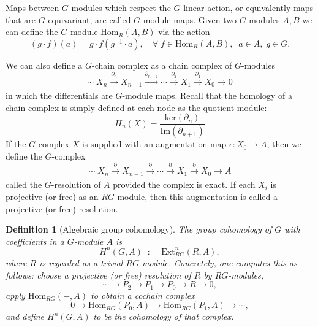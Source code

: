 \documentclass[aps,prx,reprint,superscriptaddress,twocolumn,amsmath,amssymb,amsfonts, nofootinbib]{revtex4-2}
\theoremstyle{apsstyle}
\newtheorem{definition}[theorem]{Definition}
\begin{document}
\bigskip 

Maps between $G$-modules which respect the $G$-linear action, or equivalently maps that are $G$-equivariant, are called $G$-module maps. Given two $G$-modules $A,B$ we can define the $G$-module $\mathrm{Hom}_{R}(A,B)$ via the action
\begin{equation*}
    (g\cdot f)(a) = g\cdot f(g^{-1}\cdot a),\quad \forall \; f\in \mathrm{Hom}_{R}(A,B),\;\; a\in A, \;g\in G.
\end{equation*}

\noindent We can also define a $G$-chain complex as a chain complex of $G$-modules
\begin{equation*}
    \cdots \;X_{n} \xrightarrow[]{\partial_{n}} X_{n-1} \xrightarrow[]{\partial_{n-1}} \cdots \xrightarrow[]{\partial_{2}} X_{1} \xrightarrow[]{\partial_{1}} X_{0} \to 0
\end{equation*}
in which the differentials are $G$-module maps. Recall that the homology of a chain complex is simply defined at each node as the quotient module:
\begin{equation}
    H_{n}(X) = \dfrac{\mathrm{ker}(\partial_{n})}{\mathrm{Im}(\partial_{n+1})}
    \label{eq:homology}
\end{equation}
If the $G$-complex $X$ is supplied with an augmentation map $\epsilon: X_{0}\to A$, then we define the $G$-complex 
\begin{equation*}
    \cdots \;X_{n} \xrightarrow[]{\partial} X_{n-1} \xrightarrow[]{\partial} \cdots \xrightarrow[]{\partial} X_{1} \xrightarrow[]{\partial} X_{0} \to A
\end{equation*}
called the $G$-resolution of $A$ provided the complex is exact. If each $X_{i}$ is projective (or free) as an $RG$-module, then this augmentation is called a projective (or free) resolution. 

\bigskip 

\begin{definition}[Algebraic group cohomology]
\label{def:grpcoh_alg}
The group cohomology of $G$ with coefficients in a $G$-module $A$ is
\begin{equation}
    H^n(G,A)\;:=\;\mathrm{Ext}^n_{RG}(R,A),
\end{equation}
where $R$ is regarded as a trivial $RG$-module. Concretely, one computes this as follows: choose a projective (or free) resolution of $R$ by $RG$-modules,
\begin{equation}
    \cdots \longrightarrow P_2 \longrightarrow P_1 \longrightarrow P_0 \longrightarrow R \longrightarrow 0,
\end{equation}
apply $\mathrm{Hom}_{RG}(-,A)$ to obtain a cochain complex
\begin{equation}
\label{eq:hom_cochain}
    0 \longrightarrow \mathrm{Hom}_{RG}(P_0,A) \longrightarrow \mathrm{Hom}_{RG}(P_1,A)  \longrightarrow \cdots,
\end{equation}
and define $H^n(G,A)$ to be the cohomology of that complex. 
\end{definition}
\end{document}
